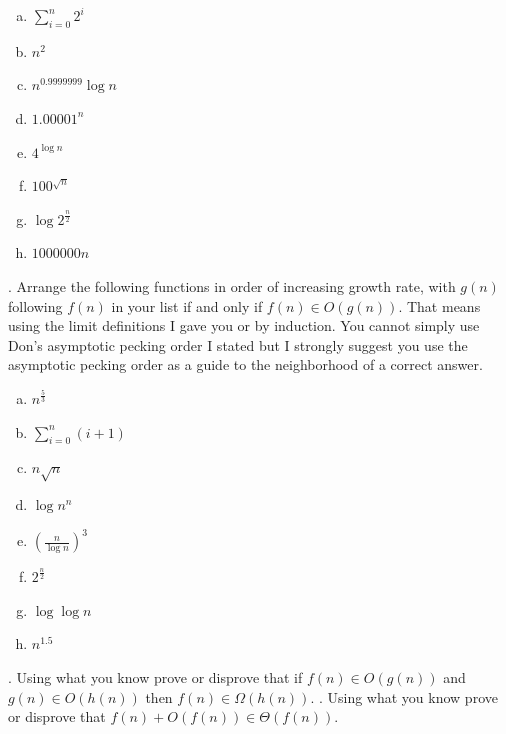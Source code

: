 \documentclass[12pt]{article}
\begin{document}
\begin{enumerate}[a)]
\item $\sum\limits_{i = 0}^{n} 2^i$\\
\item $n^2$\\
\item $n^{0.9999999}\log{n}$\\
\item $1.00001^n$\\
\item $4^{\log{n}}$\\
\item $100^{\sqrt{n}}$\\
\item $\log{2^{\frac{n}{2}}}$\\
\item $1000000n$\\
\end{enumerate}
\newpage
{}. Arrange the following functions in order of increasing growth rate, with $g(n)$ following $f(n)$ in your list if and only if $f(n) \in O(g(n))$. That means using the limit definitions I gave you or by induction. You cannot simply use Don's asymptotic pecking order I stated but I strongly suggest you use the asymptotic pecking order as a guide to the neighborhood of a correct answer.\\
\begin{enumerate}[a)]
\item  $n^{\frac{5}{3}}$\\
\item $\sum\limits_{i = 0}^{n} (i + 1)$\\
\item $n\sqrt{n}$\\
\item $\log{n^n}$\\
\item $(\frac{n}{\log{n}})^3$\\
\item  $2^{\frac{n}{2}}$\\
\item  $\log{\log{n}}$\\
\item  $n^{1.5}$\\
\end{enumerate}
\newpage
{}. Using what you know prove or disprove that  if $f(n) \in O(g(n)) $ and $g(n) \in O(h(n))$ then $f(n) \in \Omega(h(n))$.
\newpage
{}. Using what you know prove or disprove that $f(n) + O(f(n)) \in \Theta(f(n))$.
\end{document}

